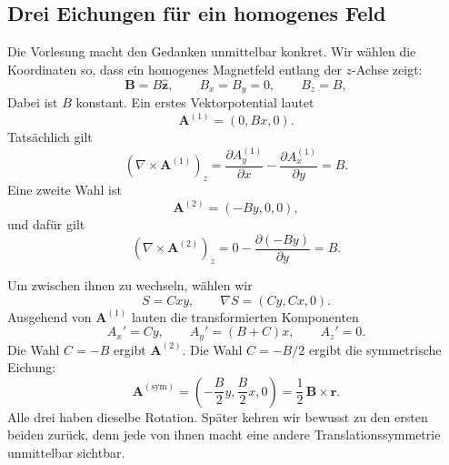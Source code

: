 \subsection{Drei Eichungen für ein homogenes Feld}

Die Vorlesung macht den Gedanken unmittelbar konkret. Wir wählen die Koordinaten so, dass ein homogenes Magnetfeld entlang der \(z\)-Achse zeigt:
\begin{equation}
  \mathbf B=B\hat{\mathbf z},
  \qquad
  B_x=B_y=0,
  \qquad
  B_z=B,
\end{equation}
Dabei ist \(B\) konstant. Ein erstes Vektorpotential lautet
\begin{equation}
  \mathbf A^{(1)}=(0,Bx,0).
\end{equation}
Tatsächlich gilt
\begin{equation}
  (\nabla\times\mathbf A^{(1)})_z
  =
  \frac{\partial A_y^{(1)}}{\partial x}
  -
  \frac{\partial A_x^{(1)}}{\partial y}
  =B.
\end{equation}
Eine zweite Wahl ist
\begin{equation}
  \mathbf A^{(2)}=(-By,0,0),
\end{equation}
und dafür gilt
\begin{equation}
  (\nabla\times\mathbf A^{(2)})_z
  =
  0-\frac{\partial(-By)}{\partial y}
  =B.
\end{equation}

Um zwischen ihnen zu wechseln, wählen wir
\begin{equation}
  S=Cxy,
  \qquad
  \nabla S=(Cy,Cx,0).
\end{equation}
Ausgehend von \(\mathbf A^{(1)}\) lauten die transformierten Komponenten
\begin{equation}
  A_x'=Cy,
  \qquad
  A_y'=(B+C)x,
  \qquad
  A_z'=0.
\end{equation}
Die Wahl \(C=-B\) ergibt \(\mathbf A^{(2)}\). Die Wahl \(C=-B/2\) ergibt die symmetrische Eichung:
\begin{equation}
  \mathbf A^{(\mathrm{sym})}
  =
  \left(-\frac{B}{2}y,\frac{B}{2}x,0\right)
  =
  \frac12\,\mathbf B\times\mathbf r.
\end{equation}
Alle drei haben dieselbe Rotation. Später kehren wir bewusst zu den ersten beiden zurück, denn jede von ihnen macht eine andere Translationssymmetrie unmittelbar sichtbar.

\begin{classroomqa}
\end{classroomqa}

